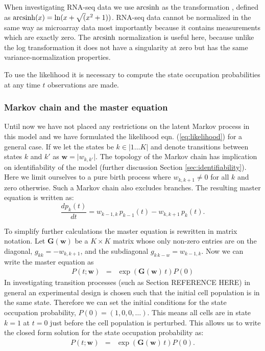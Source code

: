 
When investigating RNA-seq data we use $\operatorname{arcsinh}$ as the transformation \citep{Hoffman:2012gn,Johnson:1949uq}, defined as $\operatorname{arcsinh}(x) = \ln(x + \sqrt(x^2 +1))$. RNA-seq data cannot be normalized in the same way as microarray data most importantly because it contains measurements which are exactly zero. The $\operatorname{arcsinh}$ normalization is useful here, because unlike the log transformation it does not have a singularity at zero but has the same variance-normalization properties.

To use the likelihood it is necessary to compute the state occupation probabilities at any time $t$ observations are made.

\subsubsection{Markov chain and the master equation}
\label{sec:markov-chain-master}

Until now we have not placed any restrictions on the latent Markov process in this model and we have formulated the
likelihood eqn. (\ref{eq:likelihood}) for a general case. If we let the states be $k \in \lvert 1 \ldots K \rvert$ and denote transitions between states $k$ and $k'$ as $\mathbf{w} = \lvert w_{k,k'} \rvert$. 
The topology of the Markov chain has implication on identifiability of the model (further discussion Section \ref{sec:identifiability}). Here we limit ourselves to a pure birth process where $w_{k,k+1} \ne 0$ for all $k$ and zero otherwise. Such a Markov chain also excludes branches. The resulting master equation is written as:
\begin{equation}
  \label{eq:master}
  \frac{d p_k(t)}{dt} = w_{k-1,k}\, p_{k-1}(t) - w_{k,k+1}\, p_k(t).
\end{equation}

To simplify further calculations the master equation is rewritten in matrix notation. Let $\mathbf{G}(\mathbf{w})$ be a $K \times K$ matrix whose only non-zero entries are on the diagonal, $g_{kk}=-w_{k,k+1}$, and the subdiagonal $ g_{k\,k-w}=w_{k-1,k}$. Now we can write the master equation as
\begin{eqnarray}
  \label{eq:masterMat}
  P(t; \mathbf{w}) &=& \exp{\left(\mathbf{G}(\mathbf{w})\,t \right) } {P}(0)
\end{eqnarray} %
In investigating transition processes (such as Section REFERENCE HERE) in general an experimental design is chosen such that the initial cell population is in the same state. Therefore we can set the initial conditions for the state occupation probability, $P(0) = (1, 0 , 0, \ldots)$. This means all cells are in state $k=1$ at $t=0$ just before the cell population is perturbed. This allows us to write the closed form solution for the state occupation probability as:
\begin{eqnarray}
  \label{eq:state-occ}
  P(t; \mathbf{w}) &= & \exp{\left(\mathbf{G}(\mathbf{w})\,t \right) } {P}(0).
\end{eqnarray}

